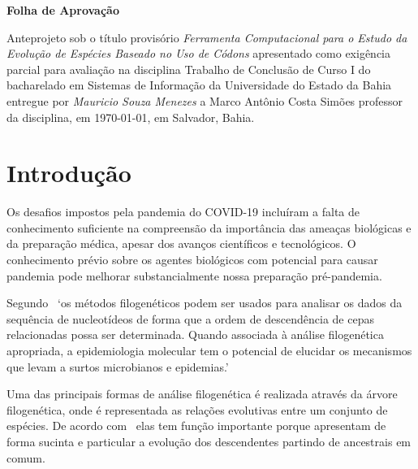 \documentclass[font=plain]{abnt}
\begin{document}
\capa
\folhaderosto

\begin{folhadeaprovacao}
    \begin{center}
        \large
        \textbf{Folha de Aprovação}
    \end{center}

    Anteprojeto sob o título provisório \textit{Ferramenta Computacional para o Estudo da Evolução de Espécies Baseado no Uso de Códons} apresentado como exigência parcial para avaliação na disciplina Trabalho de Conclusão de Curso I do bacharelado em Sistemas de Informação da Universidade do Estado da Bahia entregue por \textit{Mauricio Souza Menezes} a Marco Antônio Costa Simões professor da disciplina, em \today, em Salvador, Bahia.
    \setlength{\ABNTsignthickness}{0.4pt}
    \setlength{\ABNTsignskip}{2cm}
    \hspace*{1cm}
    \hspace*{1cm}
\end{folhadeaprovacao}




\sumario


\chapter{Introdução}

Os desafios impostos pela pandemia do COVID-19 incluíram a falta de conhecimento suficiente na compreensão da importância das ameaças biológicas e da preparação médica, apesar dos avanços científicos e tecnológicos. O conhecimento prévio sobre os agentes biológicos com potencial para causar pandemia pode melhorar substancialmente nossa preparação pré-pandemia.~\cite[p. 1]{behl_threat_2022}

Segundo~\cite[p.1]{barry_phylogenetic_analysis_2006} `os métodos filogenéticos podem ser usados para analisar os dados da sequência de nucleotídeos de forma que a ordem de descendência de cepas relacionadas possa ser determinada. Quando associada à análise filogenética apropriada, a epidemiologia molecular tem o potencial de elucidar os mecanismos que levam a surtos microbianos e epidemias.'

Uma das principais formas de análise filogenética é realizada através da árvore filogenética, onde é representada as relações evolutivas entre um conjunto de espécies. De acordo com~\cite{morrison_tree_thinking} elas tem função importante porque apresentam de forma sucinta e particular a evolução dos descendentes partindo de ancestrais em comum.
\end{document}
